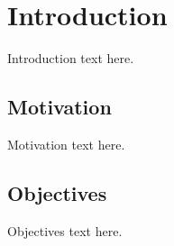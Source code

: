 \setchapterpreamble[u]{\margintoc}
\chapter{Introduction}

Introduction text here.

\section{Motivation}
Motivation text here.

\section{Objectives}
Objectives text here.
